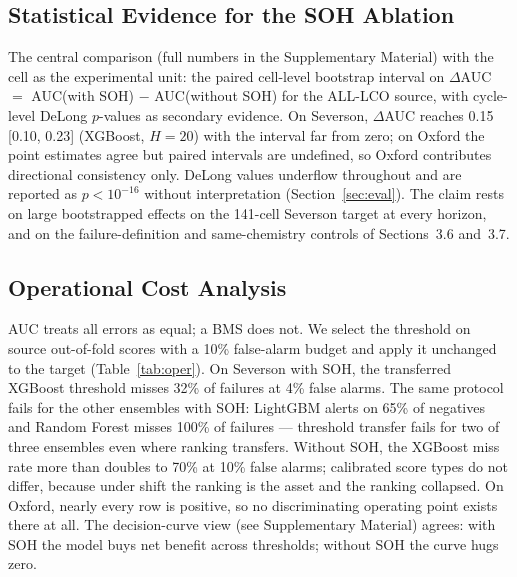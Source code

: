 \documentclass[preprint,12pt]{elsarticle}
\begin{document}
\subsection{Statistical Evidence for the SOH Ablation}
The central comparison (full numbers in the Supplementary Material) with the cell as the experimental unit: the paired cell-level bootstrap interval on $\Delta$AUC $=$ AUC(with SOH) $-$ AUC(without SOH) for the ALL-LCO source, with cycle-level DeLong $p$-values as secondary evidence. On Severson, $\Delta$AUC reaches 0.15 [0.10, 0.23] (XGBoost, $H{=}20$) with the interval far from zero; on Oxford the point estimates agree but paired intervals are undefined, so Oxford contributes directional consistency only. DeLong values underflow throughout and are reported as $p{<}10^{-16}$ without interpretation (Section~\ref{sec:eval}). The claim rests on large bootstrapped effects on the 141-cell Severson target at every horizon, and on the failure-definition and same-chemistry controls of Sections~3.6 and~3.7.



\subsection{Operational Cost Analysis}
AUC treats all errors as equal; a BMS does not. We select the threshold on source out-of-fold scores with a 10\% false-alarm budget and apply it unchanged to the target (Table~\ref{tab:oper}). On Severson with SOH, the transferred XGBoost threshold misses 32\% of failures at 4\% false alarms. The same protocol fails for the other ensembles with SOH: LightGBM alerts on 65\% of negatives and Random Forest misses 100\% of failures --- threshold transfer fails for two of three ensembles even where ranking transfers. Without SOH, the XGBoost miss rate more than doubles to 70\% at 10\% false alarms; calibrated score types do not differ, because under shift the ranking is the asset and the ranking collapsed. On Oxford, nearly every row is positive, so no discriminating operating point exists there at all. The decision-curve view (see Supplementary Material) agrees: with SOH the model buys net benefit across thresholds; without SOH the curve hugs zero.
\end{document}
